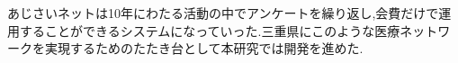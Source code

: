  あじさいネットは10年にわたる活動の中でアンケートを繰り返し,会費だけで運用することができるシステムになっていった.三重県にこのような医療ネットワークを実現するためのたたき台として本研究では開発を進めた.